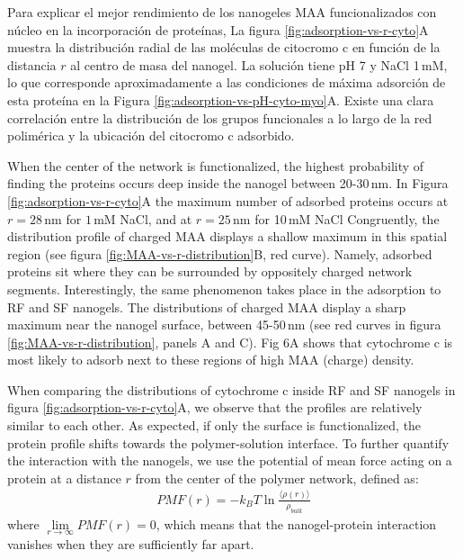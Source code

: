Para explicar el mejor rendimiento de los nanogeles MAA funcionalizados con n\'ucleo en la incorporaci\'on de prote\'inas,
La figura \ref{fig:adsorption-vs-r-cyto}A muestra la distribuci\'on radial de las mol\'eculas de citocromo c en funci\'on de la distancia $r$ al centro de masa del nanogel.
La soluci\'on tiene pH 7 y NaCl 1\,mM, lo que corresponde aproximadamente a las condiciones de m\'axima adsorci\'on de esta prote\'ina en la Figura \ref{fig:adsorption-vs-pH-cyto-myo}A.
Existe una clara correlaci\'on entre la distribuci\'on de los grupos funcionales a lo largo de la red polim\'erica y la ubicaci\'on del citocromo c adsorbido.



When the center of the network is functionalized, the highest probability of finding the proteins occurs deep inside the nanogel between 20-30\,nm.
In Figura \ref{fig:adsorption-vs-r-cyto}A the maximum number of adsorbed proteins occurs at $r=28$\,nm for $1$\,mM NaCl, and at $r=25$\,nm for 10\,mM NaCl%
Congruently, the distribution profile of charged MAA displays a shallow maximum in this spatial region (see figura \ref{fig:MAA-vs-r-distribution}B, red curve).
Namely, adsorbed proteins sit where they can be surrounded by oppositely charged network segments.
Interestingly, the same phenomenon takes place in the adsorption to RF and SF nanogels.
The distributions of charged MAA display a sharp maximum near the nanogel surface, between 45-50\,nm (see red curves in  figura \ref{fig:MAA-vs-r-distribution}, panels A and C).
Fig 6A shows that cytochrome c is most likely to adsorb next to these  regions of high MAA (charge) density.



When comparing the distributions of cytochrome c inside RF and SF nanogels in figura \ref{fig:adsorption-vs-r-cyto}A, we observe that the profiles are relatively similar to each other.
As expected, if only the surface is functionalized, the protein profile shifts towards the polymer-solution interface.
To further quantify the interaction with the nanogels, we use the potential of mean force acting on a protein at a distance $r$ from the center of the polymer network, defined as:
\begin{align}
   {PMF} (r) = -k_B T \ln \frac{\langle \rho(r)\rangle}{\rho_{bulk}}
\end{align}
where $\lim\limits_{r\to \infty}{PMF}(r)=0$, which means that the nanogel-protein interaction vanishes when they are sufficiently far apart.





